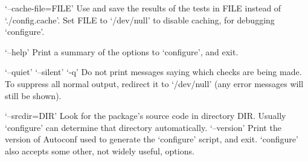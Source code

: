 \begin{DoxyCodeInclude}
`--cache-file=FILE\textcolor{stringliteral}{'}
\textcolor{stringliteral}{     Use and save the results of the tests in FILE instead of}
\textcolor{stringliteral}{     `./config.cache'}.  Set FILE to `/dev/null\textcolor{stringliteral}{' to disable caching, for}
\textcolor{stringliteral}{     debugging `configure'}.

`--help\textcolor{stringliteral}{'}
\textcolor{stringliteral}{     Print a summary of the options to `configure'}, and exit.

`--quiet\textcolor{stringliteral}{'}
\textcolor{stringliteral}{`--silent'}
`-q\textcolor{stringliteral}{'}
\textcolor{stringliteral}{     Do not print messages saying which checks are being made.  To}
\textcolor{stringliteral}{     suppress all normal output, redirect it to `/dev/null'} (any error
     messages will still be shown).

`--srcdir=DIR\textcolor{stringliteral}{'}
\textcolor{stringliteral}{     Look for the package'}s source code in directory DIR.  Usually
     `configure\textcolor{stringliteral}{' can determine that directory automatically.}
\textcolor{stringliteral}{}
\textcolor{stringliteral}{`--version'}
     Print the version of Autoconf used to generate the `configure\textcolor{stringliteral}{'}
\textcolor{stringliteral}{     script, and exit.}
\textcolor{stringliteral}{}
\textcolor{stringliteral}{`configure'} also accepts some other, not widely useful, options.
\end{DoxyCodeInclude}
 